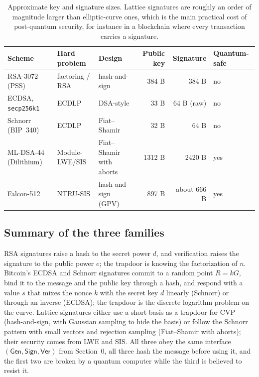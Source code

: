 \documentclass[11pt,a4paper]{article}
\theoremstyle{definition}
\newcommand{\Gen}{\mathsf{Gen}}
\newcommand{\Sign}{\mathsf{Sign}}
\newcommand{\Ver}{\mathsf{Ver}}
\begin{document}
\begin{table}[h]
\centering\footnotesize\setlength{\tabcolsep}{3.5pt}
\begin{tabular}{lllrrl}
\toprule
Scheme & Hard problem & Design & Public key & Signature & Quantum-safe\\
\midrule
RSA-3072 (PSS) & factoring / RSA & hash-and-sign & 384 B & 384 B & no\\
ECDSA, \texttt{secp256k1} & ECDLP & DSA-style & 33 B & 64 B (raw) & no\\
Schnorr (BIP~340) & ECDLP & Fiat--Shamir & 32 B & 64 B & no\\
ML-DSA-44 (Dilithium) & Module-LWE/SIS & Fiat--Shamir with aborts & 1312 B & 2420 B & yes\\
Falcon-512 & NTRU-SIS & hash-and-sign (GPV) & 897 B & about 666 B & yes\\
\bottomrule
\end{tabular}
\caption{Approximate key and signature sizes. Lattice signatures are roughly an order of magnitude larger than elliptic-curve ones, which is the main practical cost of post-quantum security, for instance in a blockchain where every transaction carries a signature.}\label{tab:sizes}
\end{table}

\subsection{Summary of the three families}

RSA signatures raise a hash to the secret power $d$, and verification raises the signature to the public power $e$; the trapdoor is knowing the factorization of $n$. Bitcoin's ECDSA and Schnorr signatures commit to a random point $R=kG$, bind it to the message and the public key through a hash, and respond with a value $s$ that mixes the nonce $k$ with the secret key $d$ linearly (Schnorr) or through an inverse (ECDSA); the trapdoor is the discrete logarithm problem on the curve. Lattice signatures either use a short basis as a trapdoor for CVP (hash-and-sign, with Gaussian sampling to hide the basis) or follow the Schnorr pattern with small vectors and rejection sampling (Fiat--Shamir with aborts); their security comes from LWE and SIS. All three obey the same interface $(\Gen,\Sign,\Ver)$ from Section~0, all three hash the message before using it, and the first two are broken by a quantum computer while the third is believed to resist it.

\end{document}
